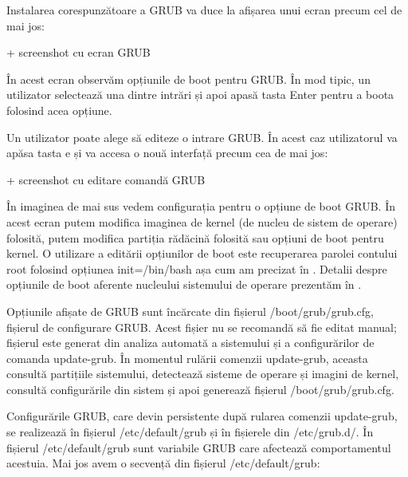 Instalarea corespunzătoare a GRUB va duce la afișarea unui ecran precum cel de
mai jos:

+ screenshot cu ecran GRUB

În acest ecran observăm opțiunile de boot pentru GRUB. În mod tipic, un
utilizator selectează una dintre intrări și apoi apasă tasta Enter pentru a
boota folosind acea opțiune.

Un utilizator poate alege să editeze o intrare GRUB. În acest caz utilizatorul
va apăsa tasta e și va accesa o nouă interfață precum cea de mai jos:

+ screenshot cu editare comandă GRUB

În imaginea de mai sus vedem configurația pentru o opțiune de boot GRUB. În
acest ecran putem modifica imaginea de kernel (de nucleu de sistem de operare)
folosită, putem modifica partiția rădăcină folosită sau opțiuni de boot pentru
kernel. O utilizare a editării opțiunilor de boot este recuperarea parolei
contului root folosind opțiunea init=/bin/bash așa cum am precizat în
. Detalii despre
opțiunile de boot aferente nucleului sistemului de operare prezentăm în
.

Opțiunile afișate de GRUB sunt încărcate din fișierul /boot/grub/grub.cfg,
fișierul de configurare GRUB. Acest fișier nu se recomandă să fie editat manual;
fișierul este generat din analiza automată a sistemului și a configurărilor de
comanda update-grub. În momentul rulării comenzii update-grub, aceasta consultă
partițiile sistemului, detectează sisteme de operare și imagini de kernel,
consultă configurările din sistem și apoi generează fișierul
/boot/grub/grub.cfg.

Configurările GRUB, care devin persistente după rularea comenzii update-grub, se
realizează în fișierul /etc/default/grub și în fișierele din /etc/grub.d/. În
fișierul /etc/default/grub sunt variabile GRUB care afectează comportamentul
acestuia. Mai jos avem o secvență din fișierul /etc/default/grub:


